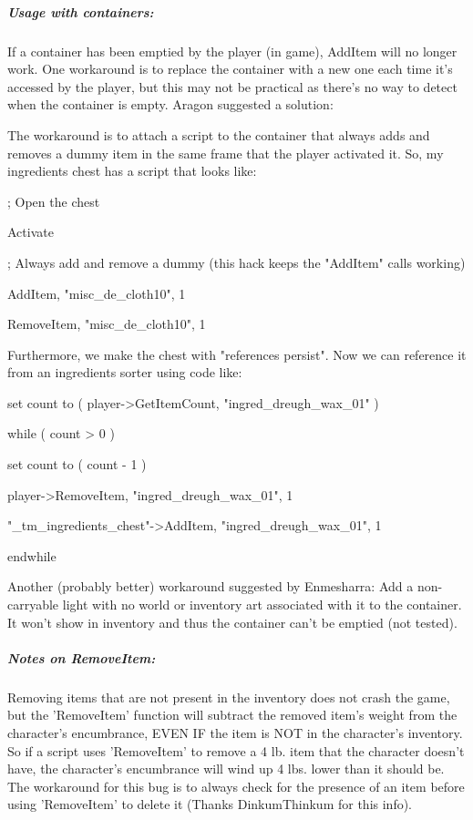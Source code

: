 \documentclass[
]{article}
\begin{document}
\hypertarget{usage-with-containers}{%
\subparagraph{Usage with containers:}\label{usage-with-containers}}

If a container has been emptied by the player (in game), AddItem will no
longer work. One workaround is to replace the container with a new one
each time it's accessed by the player, but this may not be practical as
there's no way to detect when the container is empty. Aragon suggested a
solution:

The workaround is to attach a script to the container that always adds
and removes a dummy item in the same frame that the player activated it.
So, my ingredients chest has a script that looks like:

; Open the chest

Activate

; Always add and remove a dummy (this hack keeps the "AddItem" calls
working)

AddItem, "misc\_de\_cloth10", 1

RemoveItem, "misc\_de\_cloth10", 1

Furthermore, we make the chest with "references persist". Now we can
reference it from an ingredients sorter using code like:

set count to ( player-\textgreater GetItemCount,
"ingred\_dreugh\_wax\_01" )

while ( count \textgreater{} 0 )

set count to ( count - 1 )

player-\textgreater RemoveItem, "ingred\_dreugh\_wax\_01", 1

"\_tm\_ingredients\_chest"-\textgreater AddItem,
"ingred\_dreugh\_wax\_01", 1

endwhile

Another (probably better) workaround suggested by Enmesharra: Add a
non-carryable light with no world or inventory art associated with it to
the container. It won't show in inventory and thus the container can't
be emptied (not tested).

\hypertarget{notes-on-removeitem}{%
\subparagraph{Notes on RemoveItem:}\label{notes-on-removeitem}}

Removing items that are not present in the inventory does not crash the
game, but the 'RemoveItem' function will subtract the removed item's
weight from the character's encumbrance, EVEN IF the item is NOT in the
character's inventory. So if a script uses 'RemoveItem' to remove a 4
lb. item that the character doesn't have, the character's encumbrance
will wind up 4 lbs. lower than it should be. The workaround for this bug
is to always check for the presence of an item before using 'RemoveItem'
to delete it (Thanks DinkumThinkum for this info).
\end{document}
